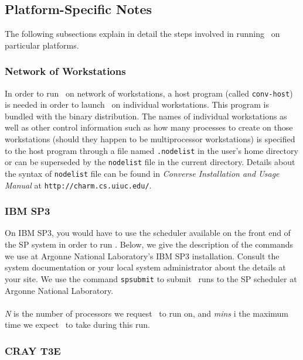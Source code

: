 \subsection{Platform-Specific Notes}

The following subsections explain in detail the steps involved in running
\NAMD\ on particular platforms.

\subsubsection{Network of Workstations}

In order to run \NAMD\ on network of workstations, a host program (called
{\tt conv-host}) is needed in order to launch \NAMD\ on individual 
workstations. This program is bundled with the binary distribution.
The names of individual workstations as well as other control information
such as how many processes to create on those workstations (should they
happen to be multiprocessor workstations) is specified to the host program
through a file named {\tt .nodelist} in the user's home directory or can
be superseded by the {\tt nodelist} file in the current directory. Details
about the syntax of {\tt nodelist} file can be found in {\em Converse
Installation and Usage Manual} at {\tt http://charm.cs.uiuc.edu/}.

\subsubsection{IBM SP3}

On IBM SP3, you would have to use the scheduler available on the front end
of the SP system in order to run \NAMD. Below, we give the description of
the commands we use at Argonne National Laboratory's IBM SP3 installation.
Consult the system documentation or your local system administrator about the
details at your site. We use the command {\tt spsubmit} to submit \NAMD\
runs to the SP scheduler at Argonne National Laboratory.\\
\\
{\em N} is the number of processors we request \NAMD\ to run on, and
{\em mins} i the maximum time we expect \NAMD\ to take during this run.

\subsubsection{CRAY T3E}

